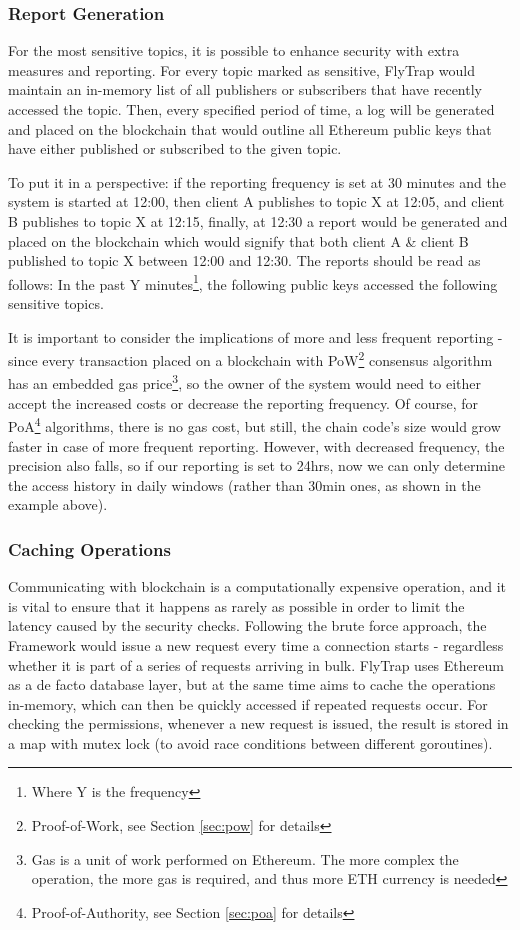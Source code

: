 \subsubsection{Report Generation}\label{sec:reports}
For the most sensitive topics, it is possible to enhance security with extra measures and reporting. For every topic marked as sensitive, FlyTrap would maintain an in-memory list of all publishers or subscribers that have recently accessed the topic. Then, every specified period of time, a log will be generated and placed on the blockchain that would outline all Ethereum public keys that have either published or subscribed to the given topic.

To put it in a perspective: if the reporting frequency is set at 30 minutes and the system is started at 12:00, then client A publishes to topic  X at 12:05, and client B publishes to topic X at 12:15, finally, at 12:30 a report would be generated and placed on the blockchain which would signify that both client A \& client B published to topic X between 12:00 and 12:30. The reports should be read as follows: In the past Y minutes\footnote{Where Y is the frequency}, the following public keys accessed the following sensitive topics. 

It is important to consider the implications of more and less frequent reporting - since every transaction placed on a blockchain with PoW\footnote{Proof-of-Work, see Section \ref{sec:pow} for details} consensus algorithm has an embedded gas price\footnote{Gas is a unit of work performed on Ethereum. The more complex the operation, the more gas is required, and thus more ETH currency is needed}, so the owner of the system would need to either accept the increased costs or decrease the reporting frequency. Of course, for PoA\footnote{Proof-of-Authority, see Section \ref{sec:poa} for details} algorithms, there is no gas cost, but still, the chain code's size would grow faster in case of more frequent reporting. However, with decreased frequency, the precision also falls, so if our reporting is set to 24hrs, now we can only determine the access history in daily windows (rather than 30min ones, as shown in the example above).
\subsubsection{Caching Operations}
Communicating with blockchain is a computationally expensive operation, and it is vital to ensure that it happens as rarely as possible in order to limit the latency caused by the security checks. Following the brute force approach, the Framework would issue a new request every time a connection starts - regardless whether it is part of a series of requests arriving in bulk. FlyTrap uses Ethereum as a de facto database layer, but at the same time aims to cache the operations in-memory, which can then be quickly accessed if repeated requests occur. For checking the permissions, whenever a new request is issued, the result is stored in a map with mutex lock (to avoid race conditions between different goroutines).

